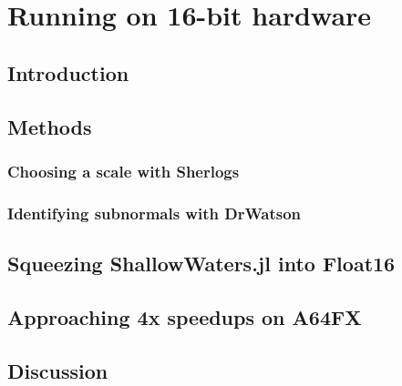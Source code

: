 \chapter{Running on 16-bit hardware}
\label{chap:hardware}

\section{Introduction}

\section{Methods}
\subsection{Choosing a scale with Sherlogs}
\subsection{Identifying subnormals with DrWatson}

\section{Squeezing ShallowWaters.jl into Float16}
\section{Approaching 4x speedups on A64FX}
\section{Discussion}